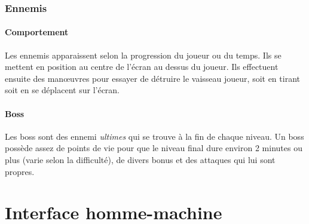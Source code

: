 \documentclass[11pt, a4paper, oneside]{article}
\begin{document}
\subsubsection{Ennemis}
\paragraph{Comportement}
Les ennemis apparaissent selon la progression du joueur ou du temps. Ils se mettent en position au centre de l'écran au dessus du joueur. Ils effectuent ensuite des manœuvres pour essayer de détruire le vaisseau joueur, soit en tirant soit en se déplacent sur l'écran.
\paragraph{Boss}
Les boss sont des ennemi \emph{ultimes} qui se trouve à la fin de chaque niveau. Un boss possède assez de points de vie pour que le niveau final dure environ 2 minutes ou plus (varie selon la difficulté), de divers bonus et des attaques qui lui sont propres.
\section{Interface homme-machine}
\end{document}
